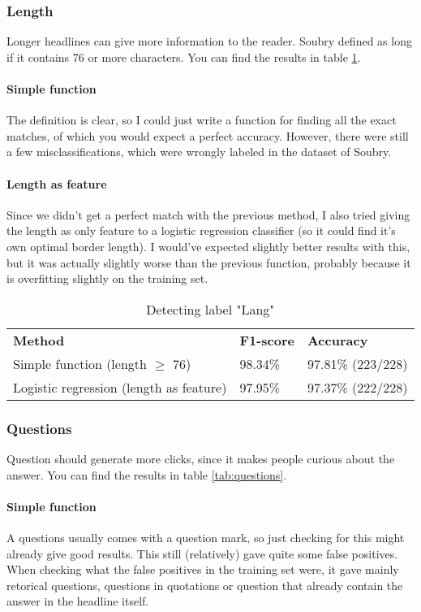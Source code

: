 \documentclass{article}
\begin{document}
\subsubsection{Length}
Longer headlines can give more information to the reader. Soubry defined as long if it contains 76 or more characters. \cite{soubry} You can find the results in table \ref{tab:length}.

\paragraph{Simple function} The definition is clear, so I could just write a function for finding all the exact matches, of which you would expect a perfect accuracy. However, there were still a few misclassifications, which were wrongly labeled in the dataset of Soubry.

\paragraph{Length as feature} Since we didn't get a perfect match with the previous method, I also tried giving the length as only feature to a logistic regression classifier (so it could find it's own optimal border length). I would've expected slightly better results with this, but it was actually slightly worse than the previous function, probably because it is overfitting slightly on the training set.


\begin{table}[]
\begin{tabular}{lll}
\textbf{Method}                          & \textbf{F1-score} & \textbf{Accuracy} \\
Simple function (length $\geq$ 76) & 98.34\%           & 97.81\% (223/228) \\
Logistic regression (length as feature)      & 97.95\%           & 97.37\% (222/228)
\end{tabular}
\caption{Detecting label "Lang"}
\label{tab:length}
\end{table}

\subsubsection{Questions}
Question should generate more clicks, since it makes people curious about the answer. \cite{soubry} You can find the results in table \ref{tab:questions}.

\paragraph{Simple function} A questions usually comes with a question mark, so just checking for this might already give good results. This still (relatively) gave quite some false positives. When checking what the false positives in the training set were, it gave mainly retorical questions, questions in quotations or question that already contain the answer in the headline itself.
\end{document}
